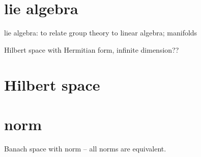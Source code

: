 \section{lie algebra}
lie algebra: to relate group theory to linear algebra; manifolds

Hilbert space with Hermitian form, infinite dimension??


\section{Hilbert space}

\section{norm}

Banach space with norm -- all norms are equivalent.


